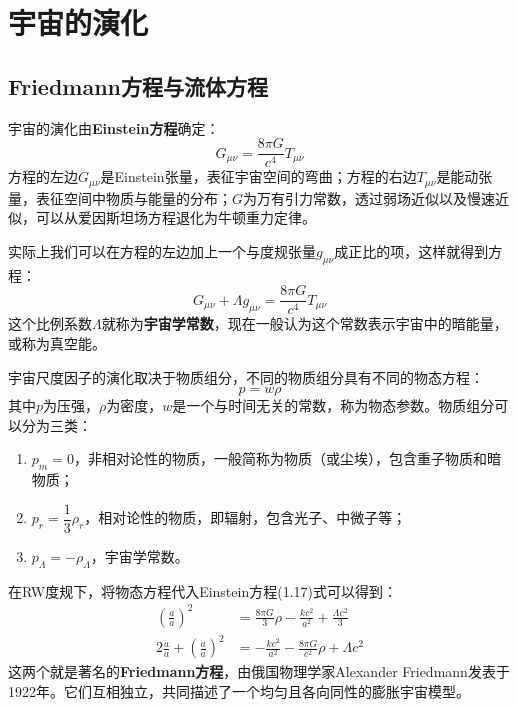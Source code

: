 \documentclass[fontset=none,openany,a4paper]{ctexbook}
\begin{document}
\chapter{宇宙的演化}

\section{Friedmann方程与流体方程}

宇宙的演化由\textbf{Einstein方程}确定：
\begin{equation}
    G_{\mu\nu} = \frac{8\pi G}{c^4}T_{\mu\nu}
\end{equation}
方程的左边$G_{\mu\nu}$是Einstein张量，表征宇宙空间的弯曲；方程的右边$T_{\mu\nu}$是能动张量，表征空间中物质与能量的分布；$G$为万有引力常数，透过弱场近似以及慢速近似，可以从爱因斯坦场方程退化为牛顿重力定律。

实际上我们可以在方程的左边加上一个与度规张量$g_{\mu\nu}$成正比的项，这样就得到方程：
\begin{equation}
    G_{\mu\nu} + \Lambda g_{\mu\nu} = \frac{8\pi G}{c^4}T_{\mu\nu}
\end{equation}
这个比例系数$\Lambda$就称为\textbf{宇宙学常数}，现在一般认为这个常数表示宇宙中的暗能量，或称为真空能。

宇宙尺度因子的演化取决于物质组分，不同的物质组分具有不同的物态方程：
\begin{equation}
    p = w\rho
\end{equation}
其中$p$为压强，$\rho$为密度，$w$是一个与时间无关的常数，称为物态参数。物质组分可以分为三类：
\begin{enumerate}
    \item $p_m = 0$，非相对论性的物质，一般简称为物质（或尘埃），包含重子物质和暗物质；
    \item $p_r = \dfrac{1}{3}\rho_r$，相对论性的物质，即辐射，包含光子、中微子等；
    \item $p_\Lambda = -\rho_\Lambda$，宇宙学常数。
\end{enumerate}
在RW度规下，将物态方程代入Einstein方程(1.17)式可以得到：
\begin{align}
    \left(\frac{\dot{a}}{a}\right)^2 &= \frac{8\pi G}{3}\rho - \frac{kc^2}{a^2} + \frac{\Lambda c^2}{3} \\
    2 \frac{\ddot{a}}{a} + \left(\frac{\dot{a}}{a}\right)^2 &= - \frac{kc^2}{a^2} -\frac{8\pi G}{c^2}\rho + \Lambda c^2
\end{align}
这两个就是著名的\textbf{Friedmann方程}，由俄国物理学家Alexander Friedmann发表于1922年。它们互相独立，共同描述了一个均匀且各向同性的膨胀宇宙模型。
\end{document}
